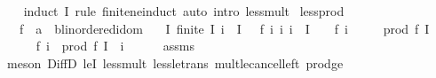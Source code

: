 \begin{isabellebody}
%
\isadelimproof
\ \ %
\endisadelimproof
%
\isatagproof
{}\isamarkupfalse%
\ {\isacharparenleft}{\kern0pt}induct\ I\ rule{\isacharcolon}{\kern0pt}\ finite{\isacharunderscore}{\kern0pt}ne{\isacharunderscore}{\kern0pt}induct{\isacharparenright}{\kern0pt}\ {\isacharparenleft}{\kern0pt}auto\ intro{\isacharcolon}{\kern0pt}\ less{\isacharunderscore}{\kern0pt}{}{\isacharunderscore}{\kern0pt}mult{\isacharparenright}{\kern0pt}%
\endisatagproof
{\isafoldproof}%
%
\isadelimproof
\isanewline
%
\endisadelimproof
\isanewline
{}\isamarkupfalse%
\ less{\isacharunderscore}{\kern0pt}{}{\isacharunderscore}{\kern0pt}prod{}{\isacharcolon}{\kern0pt}\isanewline
\ \ \ f\ {\isacharcolon}{\kern0pt}{\isacharcolon}{\kern0pt}\ {\isachardoublequoteopen}{\isacharprime}{\kern0pt}a\ {\isasymRightarrow}\ {\isacharprime}{\kern0pt}b{\isacharcolon}{\kern0pt}{\isacharcolon}{\kern0pt}linordered{\isacharunderscore}{\kern0pt}idom{\isachardoublequoteclose}\isanewline
\ \ \ I{\isacharcolon}{\kern0pt}\ {\isachardoublequoteopen}finite\ I{\isachardoublequoteclose}\ {\isachardoublequoteopen}i\ {\isasymin}\ I{\isachardoublequoteclose}\ {\isachardoublequoteopen}{}\ {\isacharless}{\kern0pt}\ f\ i{\isachardoublequoteclose}\ {\isachardoublequoteopen}{\isasymAnd}i{\isachardot}{\kern0pt}\ i\ {\isasymin}\ I\ {\isasymLongrightarrow}\ {}\ {\isasymle}\ f\ i{\isachardoublequoteclose}\isanewline
\ \ \ {\isachardoublequoteopen}{}\ {\isacharless}{\kern0pt}\ prod\ f\ I{\isachardoublequoteclose}\isanewline
%
\isadelimproof
%
\endisadelimproof
%
\isatagproof
{}\isamarkupfalse%
\ {\isacharminus}{\kern0pt}\isanewline
\ \ \isamarkupfalse%
\ {\isachardoublequoteopen}{}\ {\isacharless}{\kern0pt}\ f\ i\ {\isacharasterisk}{\kern0pt}\ prod\ f\ {\isacharparenleft}{\kern0pt}I\ {\isacharminus}{\kern0pt}\ {\isacharbraceleft}{\kern0pt}i{\isacharbraceright}{\kern0pt}{\isacharparenright}{\kern0pt}{\isachardoublequoteclose}\isanewline
\ \ \ \ \isamarkupfalse%
\ assms\isanewline
\ \ \ \ \isamarkupfalse%
\ {\isacharparenleft}{\kern0pt}meson\ DiffD{}\ leI\ less{\isacharunderscore}{\kern0pt}{}{\isacharunderscore}{\kern0pt}mult\ less{\isacharunderscore}{\kern0pt}le{\isacharunderscore}{\kern0pt}trans\ mult{\isacharunderscore}{\kern0pt}le{\isacharunderscore}{\kern0pt}cancel{\isacharunderscore}{\kern0pt}left{}\ prod{\isacharunderscore}{\kern0pt}ge{\isacharunderscore}{\kern0pt}{}{\isacharparenright}{\kern0pt}\isanewline

\end{isabellebody}
